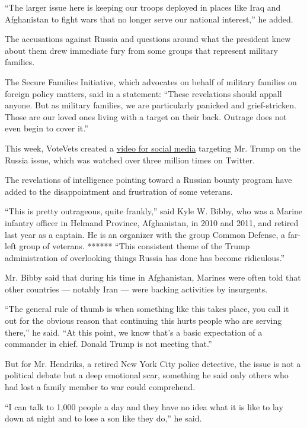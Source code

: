 ``The larger issue here is keeping our troops deployed in places like
Iraq and Afghanistan to fight wars that no longer serve our national
interest,'' he added.

The accusations against Russia and questions around what the president
knew about them drew immediate fury from some groups that represent
military families.

The Secure Families Initiative, which advocates on behalf of military
families on foreign policy matters, said in a statement: ``These
revelations should appall anyone. But as military families, we are
particularly panicked and grief-stricken. Those are our loved ones
living with a target on their back. Outrage does not even begin to cover
it.''

This week, VoteVets created a
\href{https://twitter.com/votevets/status/1277295496105807873}{video for
social media} targeting Mr. Trump on the Russia issue, which was watched
over three million times on Twitter.

The revelations of intelligence pointing toward a Russian bounty program
have added to the disappointment and frustration of some veterans.

``This is pretty outrageous, quite frankly,'' said Kyle W. Bibby, who
was a Marine infantry officer in Helmand Province, Afghanistan, in 2010
and 2011, and retired last year as a captain. He is an organizer with
the group Common Defense, a far-left group of veterans. ****** ``This
consistent theme of the Trump administration of overlooking things
Russia has done has become ridiculous.''

Mr. Bibby said that during his time in Afghanistan, Marines were often
told that other countries --- notably Iran --- were backing activities
by insurgents.

``The general rule of thumb is when something like this takes place, you
call it out for the obvious reason that continuing this hurts people who
are serving there,'' he said. ``At this point, we know that's a basic
expectation of a commander in chief. Donald Trump is not meeting that.''

But for Mr. Hendriks, a retired New York City police detective, the
issue is not a political debate but a deep emotional scar, something he
said only others who had lost a family member to war could comprehend.

``I can talk to 1,000 people a day and they have no idea what it is like
to lay down at night and to lose a son like they do,'' he said.

